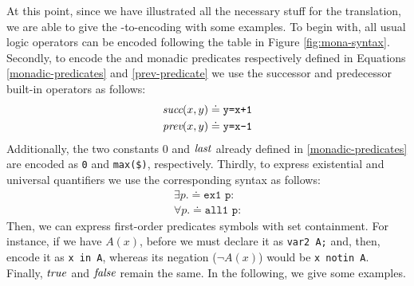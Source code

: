 At this point, since we have illustrated all the necessary stuff for the translation, we are able to give the \FOL-to-\MONA encoding with some examples.
To begin with, all usual logic operators can be encoded following the table in Figure \ref{fig:mona-syntax}. Secondly, to encode the \suc and \pre monadic predicates respectively defined in Equations \ref{monadic-predicates} and \ref{prev-predicate} we use the successor and predecessor built-in operators as follows:
\begin{align*}
\textit{succ}(x,y) \doteq \texttt{y=x+1}\\
\textit{prev}(x,y) \doteq \texttt{y=x-1}
\end{align*}
Additionally, the two constants $0$ and $\mathit{last}$ already defined in \ref{monadic-predicates} are encoded as \texttt{0} and \texttt{max(\$)}, respectively.
Thirdly, to express existential and universal quantifiers we use the corresponding syntax as follows:
\begin{align*}
\exists p. \doteq \texttt{ex1 p:}\\
\forall p. \doteq \texttt{all1 p:}
\end{align*}
Then, we can express first-order predicates symbols with set containment. For instance, if we have $A(x)$, before we must declare it as \texttt{var2 A;} and, then, encode it as \texttt{x in A}, whereas its negation ($\lnot A(x)$) would be \texttt{x notin A}. Finally, $\mathit{true}$ and $\mathit{false}$ remain the same.
In the following, we give some examples.
